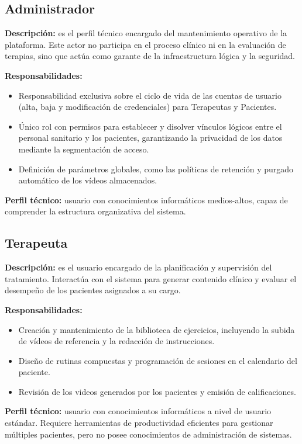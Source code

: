 \subsection{Administrador}
\textbf{Descripción:} es el perfil técnico encargado del mantenimiento operativo de la plataforma. Este actor no participa en el proceso clínico ni en la evaluación de terapias, sino que actúa como garante de la infraestructura lógica y la seguridad.

\textbf{Responsabilidades:}
\begin{itemize}
    \item Responsabilidad exclusiva sobre el ciclo de vida de las cuentas de usuario (alta, baja y modificación de credenciales) para Terapeutas y Pacientes.
    \item Único rol con permisos para establecer y disolver vínculos lógicos entre el personal sanitario y los pacientes, garantizando la privacidad de los datos mediante la segmentación de acceso.
    \item Definición de parámetros globales, como las políticas de retención y purgado automático de los vídeos almacenados.
\end{itemize}

\textbf{Perfil técnico:} usuario con conocimientos informáticos medios-altos, capaz de comprender la estructura organizativa del sistema.

\subsection{Terapeuta}
\textbf{Descripción:} es el usuario encargado de la planificación y supervisión del tratamiento. Interactúa con el sistema para generar contenido clínico y evaluar el desempeño de los pacientes asignados a su cargo.

\textbf{Responsabilidades:}
\begin{itemize}
    \item Creación y mantenimiento de la biblioteca de ejercicios, incluyendo la subida de vídeos de referencia y la redacción de instrucciones.
    \item Diseño de rutinas compuestas y programación de sesiones en el calendario del paciente.
    \item Revisión de los videos generados por los pacientes y emisión de calificaciones.
\end{itemize}

\textbf{Perfil técnico:} usuario con conocimientos informáticos a nivel de usuario estándar. Requiere herramientas de productividad eficientes para gestionar múltiples pacientes, pero no posee conocimientos de administración de sistemas.

